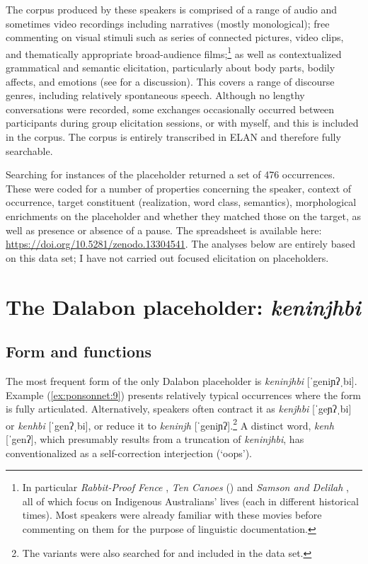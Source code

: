 \documentclass[output=paper]{langscibook}
\begin{document}
The corpus produced by these speakers is comprised of a range of audio and sometimes video recordings including narratives (mostly monological); free commenting on visual stimuli such as series of connected pictures, video clips, and thematically appropriate broad-audience films;\footnote{In particular \textit{Rabbit-Proof Fence} \citep{Noyce2002}, \textit{Ten Canoes} (\citealt{HeerHeer2006}) and \textit{Samson and Delilah} \citep{Thornton2009}, all of which focus on Indigenous Australians’ lives (each in different historical times). Most speakers were already familiar with these movies before commenting on them for the purpose of linguistic documentation.} as well as contextualized grammatical and semantic elicitation, particularly about body parts, bodily affects, and emotions (see \citealt{Ponsonnet2014b} for a discussion). This covers a range of discourse genres, including relatively spontaneous speech. Although no lengthy conversations were recorded, some exchanges occasionally occurred between participants during group elicitation sessions, or with myself, and this is included in the corpus. The corpus is entirely transcribed in ELAN and therefore fully searchable.

Searching for instances of the placeholder returned a set of 476 occurrences. These were coded for a number of properties concerning the speaker, context of occurrence, target constituent (realization, word class, semantics), morphological enrichments on the placeholder and whether they matched those on the target, as well as presence or absence of a pause. The spreadsheet is available here: \url{https://doi.org/10.5281/zenodo.13304541}. The analyses below are entirely based on this data set; I have not carried out focused elicitation on placeholders. 

\section{The Dalabon placeholder: \textit{keninjhbi}}
\label{sec:ponsonnet:3}
\subsection{Form and functions}
\label{sec:ponsonnet:3.1}
The most frequent form of the only Dalabon placeholder is \textit{keninjhbi} [ˈgeniɲʔˌbi]. Example (\ref{ex:ponsonnet:9}) presents relatively typical occurrences where the form is fully articulated. Alternatively, speakers often contract it as \textit{kenjhbi} [ˈgeɲʔˌbi] or \textit{kenhbi} [ˈgenʔˌbi], or reduce it to \textit{keninjh} [ˈgeniɲʔ].\footnote{The variants were also searched for and included in the data set.}  A distinct word, \textit{kenh} [ˈgenʔ], which presumably results from a truncation of \textit{keninjhbi}, has conventionalized as a self-correction interjection (‘oops’). 
\end{document}
